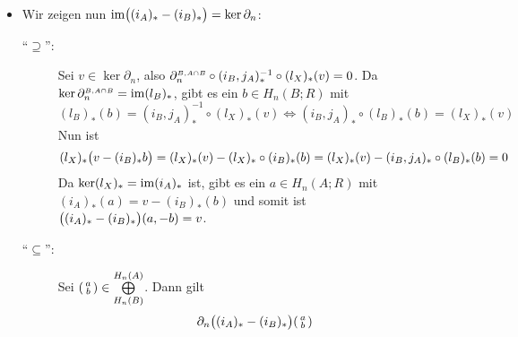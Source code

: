 \begin{beweis}
\begin{itemize}
		\item Wir zeigen nun $\im\enbrace[\big]{ (i_A)_* - (i_B)_*} = \ker \partial_n$:
		\begin{description}
			\item[\enquote{$\supseteq$}:] Sei $v \in \ker \partial_n$, also $\rand{B, A\cap B}_n \circ  (i_B,j_A)_*^{-1} \circ (l_X)_*(v)=0$. Da $\ker \rand{B, A\cap B}_n =\im (l_B)_*$,
			gibt es ein $b \in H_n(B;R)$ mit
			\[
				(l_B)_*(b) = (i_B,j_A)_*^{-1} \circ (l_X)_*(v) \iff (i_B,j_A)_* \circ(l_B)_*(b) = (l_X)_*(v)
			\]
			Nun ist
			\[
				(l_X)_* \enbrace[\big]{v- (i_B)_* b} = (l_X)_*(v) - (l_X)_* \circ (i_B)_*(b) = (l_X)_*(v) -(i_B,j_A)_* \circ(l_B)_*(b)=0
			\]
			Da $\ker (l_X)_* = \im (i_A)_*$ ist, gibt es ein $a \in H_n(A;R)$ mit $(i_A)_*(a) = v - (i_B)_* (b)$ und somit ist
			$\enbrace[\big]{(i_A)_* - (i_B)_*}(a,-b) = v$.
			\item[\enquote{$\subseteq$}:] Sei $\begin{psmallmatrix} a \\ b \end{psmallmatrix} \in \bigoplus\limits_{H_n(B)}^{H_n(A)}$. Dann gilt
			\begin{align*}
				\partial_n \enbrace[\big]{(i_A)_* - (i_B)_*}  \begin{psmallmatrix} a \\ b \end{psmallmatrix} 

\end{align*}
\end{description}
\end{itemize}
\end{beweis}
